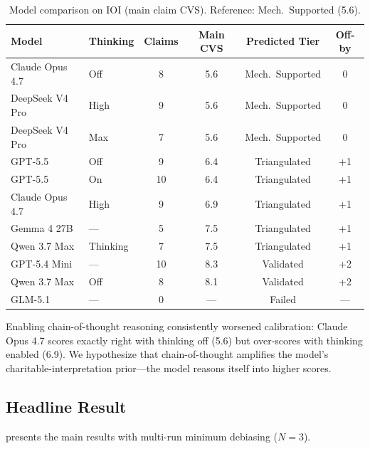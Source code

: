 \documentclass[10pt]{article}
\newcommand{\tighttable}{\setlength{\tabcolsep}{4pt}\renewcommand{\arraystretch}{1.05}}
\begin{document}
\begin{table}[t]
\centering
\tighttable
\caption{Model comparison on IOI (main claim CVS). Reference: Mech.\ Supported (5.6).}
\label{tab:models}
\small
\begin{tabular}{@{}llcccc@{}}
\toprule
\textbf{Model} & \textbf{Thinking} & \textbf{Claims} & \textbf{Main CVS} & \textbf{Predicted Tier} & \textbf{Off-by} \\
\midrule
Claude Opus 4.7 & Off & 8 & 5.6 & Mech.\ Supported & 0 \\
DeepSeek V4 Pro & High & 9 & 5.6 & Mech.\ Supported & 0 \\
DeepSeek V4 Pro & Max & 7 & 5.6 & Mech.\ Supported & 0 \\
GPT-5.5 & Off & 9 & 6.4 & Triangulated & +1 \\
GPT-5.5 & On & 10 & 6.4 & Triangulated & +1 \\
Claude Opus 4.7 & High & 9 & 6.9 & Triangulated & +1 \\
Gemma 4 27B & --- & 5 & 7.5 & Triangulated & +1 \\
Qwen 3.7 Max & Thinking & 7 & 7.5 & Triangulated & +1 \\
GPT-5.4 Mini & --- & 10 & 8.3 & Validated & +2 \\
Qwen 3.7 Max & Off & 8 & 8.1 & Validated & +2 \\
GLM-5.1 & --- & 0 & --- & Failed & --- \\
\bottomrule
\end{tabular}
\end{table}

Enabling chain-of-thought reasoning consistently worsened calibration: Claude Opus 4.7 scores exactly right with thinking off (5.6) but over-scores with thinking enabled (6.9). We hypothesize that chain-of-thought amplifies the model's charitable-interpretation prior---the model reasons itself into higher scores.

\subsection{Headline Result}

 presents the main results with multi-run minimum debiasing ($N=3$).

\end{document}
